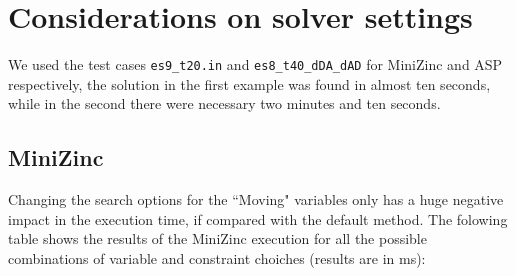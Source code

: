 \documentclass[11pt]{article}
\begin{document}
\section{Considerations on solver settings}

We used the test cases \verb+es9_t20.in+ and \verb+es8_t40_dDA_dAD+ for MiniZinc and ASP respectively, 
the solution in the first example was found in almost ten seconds, while in the second there were necessary two minutes and ten seconds.

\subsection{MiniZinc}

Changing the search options for the ``Moving" variables only has a huge negative impact in the execution time, if compared with the default method.
The folowing table shows the results of the MiniZinc execution for all the possible combinations of variable and constraint choiches (results are in ms):
\end{document}

